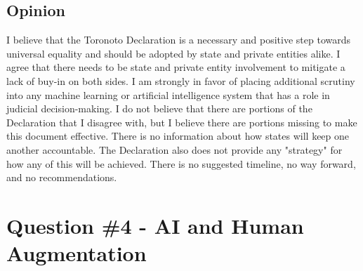 \documentclass[
	letterpaper, %
]{jdf}
\begin{document}
\subsection{Opinion}
I believe that the Toronoto Declaration is a necessary and positive step towards universal equality and should be adopted by state and private entities alike. I agree that there needs to be state and private entity involvement to mitigate a lack of buy-in on both sides. I am strongly in favor of placing additional scrutiny into any machine learning or artificial intelligence system that has a role in judicial decision-making. I do not believe that there are portions of the Declaration that I disagree with, but I believe there are portions missing to make this document effective. There is no information about how states will keep one another accountable. The Declaration also does not provide any "strategy" for how any of this will be achieved. There is no suggested timeline, no way forward, and no recommendations.
\section{Question \#4 - AI and Human Augmentation}


\end{document}
